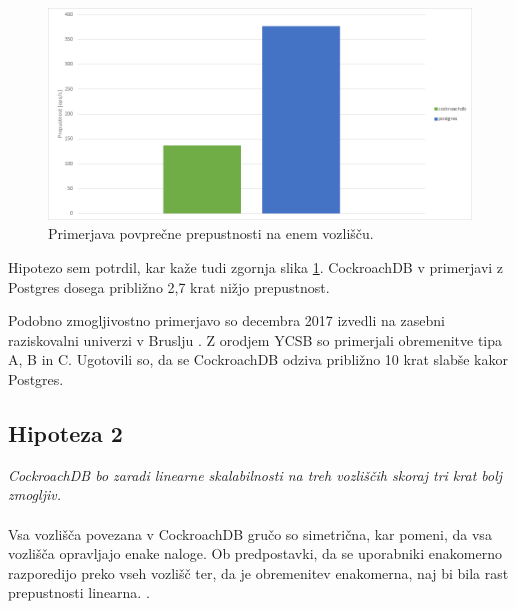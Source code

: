 \documentclass[a4paper, 12pt]{book}
\begin{document}
\begin{figure}[H]
\begin{center}
\includegraphics[width=1\textwidth]{resources/throughput-comparison-n1-v2.png}
\end{center}
\caption{Primerjava povprečne prepustnosti na enem vozlišču.}
\label{img_ycsb_results_throughptu_comparison_n1}
\end{figure}

Hipotezo sem potrdil, kar kaže tudi zgornja slika \ref{img_ycsb_results_throughptu_comparison_n1}. CockroachDB v primerjavi z Postgres dosega približno 2,7 krat nižjo prepustnost.

Podobno zmogljivostno primerjavo so decembra 2017 izvedli na zasebni raziskovalni univerzi v Bruslju \cite{CRDB-2017}. Z orodjem YCSB so primerjali obremenitve tipa A, B in C. Ugotovili so, da se CockroachDB odziva približno 10 krat slabše kakor Postgres.

\subsection{Hipoteza 2}
\textit{CockroachDB bo zaradi linearne skalabilnosti na treh vozliščih skoraj tri krat bolj zmogljiv.}\\\\Vsa vozlišča povezana v CockroachDB gručo so simetrična, kar pomeni, da vsa vozlišča opravljajo enake naloge. Ob predpostavki, da se uporabniki enakomerno razporedijo preko vseh vozlišč ter, da je obremenitev enakomerna, naj bi bila rast prepustnosti linearna. \cite{CRDB-design}.
\end{document}
